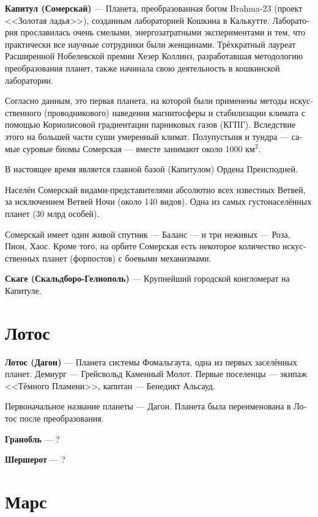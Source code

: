 \documentclass[a4paper,12pt,fleqn]{book}\usepackage{cooltooltips}\usepackage{polyglossia}\setdefaultlanguage[babelshorthands=true]{russian}\setotherlanguage{english}\defaultfontfeatures{Ligatures=TeX,Mapping=tex-text} \usepackage{xcolor}\definecolor{lightgray}{HTML}{bbbbbb}\color{lightgray}\newcommand{\ml}[3]{\textenglish{\textcolor{black}{#3}}}
\newcommand{\asterism}{\vspace{1em}{\centering\Large\bfseries$\ast~\ast~\ast$\par}\vspace{1em}}
\newcommand{\theterm}[3]{\textbf{\hypertarget{#1}{#2}} --- #3}
\begin{document}
\theterm{capitul}
{Капитул (Сомерскай)}
{Планета, преобразованная богом Brahma-23 (проект <<Золотая ладья>>), созданным лабораторией Кошкина в Калькутте.
Лаборатория прославилась очень смелыми, энергозатратными экспериментами и тем, что практически все научные сотрудники были женщинами.
Трёхкратный лауреат Расширенной Нобелевской премии Хезер Коллинз, разработавшая методологию преобразования планет, также начинала свою деятельность в кошкинской лаборатории.

Согласно данным, это первая планета, на которой были применены методы искусственного (проводникового) наведения магнитосферы и стабилизации климата с помощью Кориолисовой градиентации парниковых газов (КГПГ).
Вследствие этого на большей части суши умеренный климат.
Полупустыня и тундра --- самые суровые биомы Сомерская --- вместе занимают около 1000 км$^2$.

В настоящее время является главной базой (Капитулом) Ордена Преисподней.

Населён Сомерскай видами-представителями абсолютно всех известных Ветвей, за исключением Ветвей Ночи (около 140 видов).
Одна из самых густонаселённых планет (30 млрд особей).

Сомерскай имеет один живой спутник --- Баланс --- и три неживых --- Роза, Пион, Хаос.
Кроме того, на орбите Сомерская есть некоторое количество искусственных планет (форпостов) с боевыми механизмами.}

\asterism

\theterm{scage}
{Скаге (Скальдборо-Гелиополь)}
{Крупнейший городской конгломерат на Капитуле.}

\section{Лотос}

\theterm{lotus}
{Лотос (Дагон)}
{Планета системы Фомальгаута, одна из первых заселённых планет.
Демиург --- Грейсвольд Каменный Молот.
Первые поселенцы --- экипаж <<Тёмного Пламени>>, капитан --- Бенедикт Альсауд.

Первоначальное название планеты --- Дагон.
Планета была переименована в Лотос после преобразования.}

\asterism

\theterm{granoble}
{Гранобль}
{?}

\theterm{chercherotte}
{Шершерот}
{?}

\section{Марс}
\end{document}
